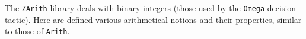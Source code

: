 The {\tt ZArith} library deals with binary integers (those used
by the {\tt Omega} decision tactic).
Here are defined various arithmetical notions and their properties,
similar to those of {\tt Arith}.

